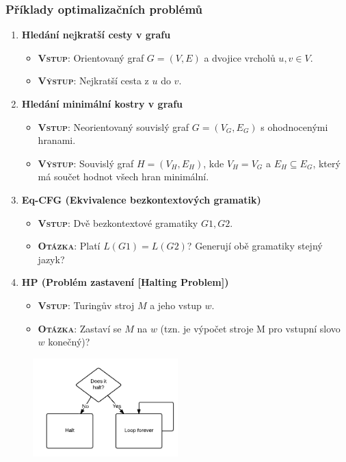 \subsubsection{Příklady optimalizačních problémů}
\begin{enumerate}
\item \textbf{Hledání nejkratší cesty v grafu}
\begin{itemize}
	\item \textbf{\textsc{Vstup}}: Orientovaný graf $G = (V, E)$ a dvojice vrcholů $u, v \in V$.
	\item \textbf{\textsc{Výstup}}: Nejkratší cesta z $u$ do $v$.
\end{itemize}
\item \textbf{Hledání minimální kostry v grafu}
\begin{itemize}
\item \textbf{\textsc{Vstup}}: Neorientovaný souvislý graf $G = (V_G,E_G)$ s ohodnocenými hranami. 
\item \textbf{\textsc{Výstup}}: Souvislý graf $H = (V_H,E_H)$, kde $V_H = V_G$ a $E_H \subseteq E_G$, který má součet hodnot všech hran minimální.
\end{itemize}
\item \textbf{Eq-CFG (Ekvivalence bezkontextových gramatik)}
\begin{itemize}
\item \textbf{\textsc{Vstup}}: Dvě bezkontextové gramatiky $G1, G2$.
\item \textbf{\textsc{Otázka}}: Platí $L(G1) = L(G2)$? Generují obě gramatiky stejný jazyk?
\end{itemize}
\item \textbf{HP (Problém zastavení [Halting Problem])}
\begin{itemize}
\item \textbf{\textsc{Vstup}}: Turingův stroj $M$ a jeho vstup $w$.
\item \textbf{\textsc{Otázka}}: Zastaví se $M$ na $w$ (tzn. je výpočet stroje M pro vstupní slovo $w$ konečný)?
\end{itemize}
\end{enumerate}


\begin{figure}[H]
	\centering
	\includegraphics[width=0.5\textwidth]{assets/halting}
\end{figure}
